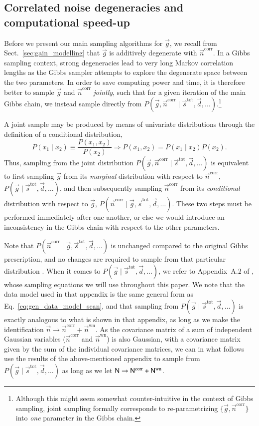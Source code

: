 \documentclass[twocolumn]{aa}
\renewcommand{\d}[0]{\vec{d}}
\newcommand{\n}[0]{\vec{n}}
\newcommand{\s}[0]{\vec{s}}
\newcommand{\g}[0]{\vec{g}}
\newcommand{\N}[0]{\tens{N}}
\newcommand{\tot}[0]{^{\mathrm{tot}}}
\newcommand{\corr}[0]{^{\mathrm{corr}}}
\newcommand{\wn}[0]{^{\mathrm{wn}}}
\begin{document}
\subsection{Correlated noise degeneracies and computational speed-up}
\label{sec:corrnoise}

Before we present our main sampling algorithms for $\g$, we recall from
Sect.~\ref{sec:gain_modelling} that $\g$ is additively degenerate with
$\n\corr$. In a Gibbs sampling context, strong degeneracies lead to
very long Markov correlation lengths as the Gibbs sampler attempts to
explore the degenerate space between the two parameters. In order to
save computing power and time, it is therefore better to sample $\g$
and $\n\corr$ \emph{jointly}, such that for a given iteration of the
main Gibbs chain, we instead sample directly from $P(\g,
\n\corr\mid\s\tot, \d, \ldots)$.\footnote{Although this might seem somewhat
  counter-intuitive in the context of Gibbs sampling, joint sampling
  formally corresponds to re-parametrizing $\{\g, \n\corr\}$ into
  \emph{one} parameter in the Gibbs chain.}

A joint sample may be produced by means of univariate distributions
through the definition of a conditional distribution,
\begin{equation}
	P(x_1\mid x_2) \equiv \frac{P(x_1, x_2)}{P(x_2)} \Rightarrow P(x_1, x_2) = P(x_1\mid x_2)P(x_2).
\end{equation}
Thus, sampling from the joint distribution $P(\g, \n\corr\mid \s\tot, \d, \ldots)$ is equivalent to
first sampling $\g$ from its \emph{marginal} distribution with respect
to $\n\corr$, $P(\g\mid \s\tot, \d, \ldots)$, and then subsequently
sampling $\n\corr$ from its \emph{conditional} distribution with
respect to $\g$, $P(\n\corr\mid\g, \s\tot, \d, \ldots)$. These two steps must
be performed immediately after one another, or else we would introduce
an inconsistency in the Gibbs chain with respect to the other parameters.

Note that $P(\n\corr\mid\g, \s\tot, \d, \ldots)$ is unchanged compared to
the original Gibbs prescription, and no changes are required to sample
from that particular distribution \citep[see][for more details on this
sampling process]{bp06}. When it comes to ${P(\g\mid\s\tot, \d, \ldots)}$, we refer to Appendix~A.2 of \citet{bp01}, whose sampling equations we will use throughout this paper. We note that the data model used in that appendix is the same general form as Eq.~\eqref{eq:gen_data_model_scan}, and that sampling from $P(\g\mid\s\tot, \d, \ldots)$ is exactly analogous to what is shown in that appendix, as long as we make the identification $\n \rightarrow \n\corr + \n\wn$. As the covariance matrix of a sum of independent Gaussian variables ($\n\corr$ and $\n\wn$) is also Gaussian, with a covariance matrix given by the sum of the individual covariance matrices, we can in what follows use the results of the above-mentioned appendix to sample from $P(\g\mid\s\tot, \d, \ldots)$ as long as we let $\N \rightarrow \N\corr + \N\wn$.
\end{document}
